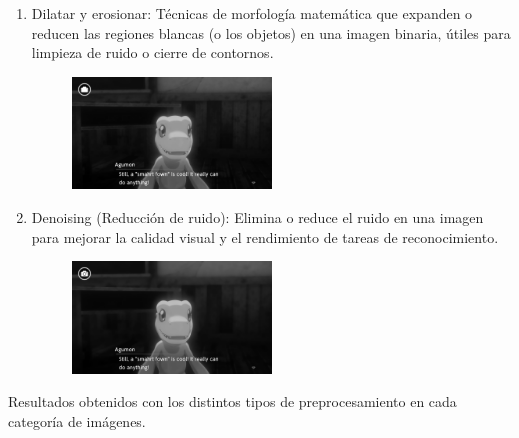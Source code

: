 \begin{enumerate}
	\item Dilatar y erosionar: 
	Técnicas de morfología matemática que expanden o reducen las regiones blancas (o los objetos) en una imagen binaria, útiles para limpieza de ruido o cierre de contornos.
		\begin{figure}[H]
		\centering
		\includegraphics[width = 0.5\textwidth]{Imagenes/Preprocesado/10.png}
	\end{figure}
	
	\item Denoising (Reducción de ruido): 
	Elimina o reduce el ruido en una imagen para mejorar la calidad visual y el rendimiento de tareas de reconocimiento.
		\begin{figure}[H]
		\centering
		\includegraphics[width = 0.5\textwidth]{Imagenes/Preprocesado/11.png}
	\end{figure}
	
\end{enumerate}
Resultados obtenidos con los distintos tipos de preprocesamiento en cada categoría de imágenes.
